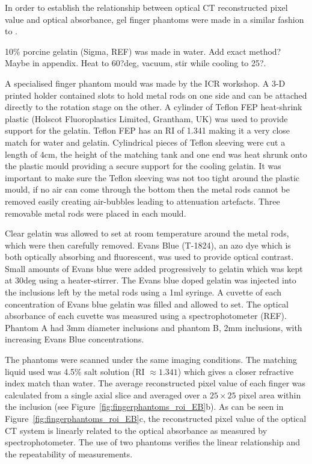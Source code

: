 In order to establish the relationship between optical CT reconstructed pixel value and optical absorbance,  gel finger phantoms were made in a similar fashion to \cite{Oldham:2003}.  

10\% porcine gelatin (Sigma, REF) was made in water. Add exact method? Maybe in appendix. Heat to 60?deg, vacuum, stir while cooling to 25?. 

A specialised finger phantom mould was made by the ICR workshop. A 3-D printed holder contained slots to hold metal rods on one side and can be attached directly to the rotation stage on the other. A cylinder of Teflon FEP heat-shrink plastic (Holscot Fluoroplastics Limited, Grantham, UK) was used to provide support for the gelatin. Teflon FEP has an RI of 1.341  making it a very close match for water and gelatin. \cite{Krstajic:2006kna} Cylindrical pieces of Teflon sleeving were cut a length of 4cm, the height of the matching tank and one end was heat shrunk onto the plastic mould providing a secure support for the cooling gelatin. It was important to make sure the Teflon sleeving was not too tight around the plastic mould, if no air can come through the bottom then the metal rods cannot be removed easily creating air-bubbles leading to attenuation artefacts. Three removable metal rods were placed in each mould.


Clear gelatin was allowed to set at room temperature around the metal rods, which  were then carefully removed.  Evans Blue (T-1824), an azo dye which is both optically absorbing and  fluorescent, was used to provide optical contrast. Small amounts of Evans blue were added progressively to gelatin which was kept at 30deg using a heater-stirrer. The Evans blue doped gelatin was injected into the inclusions left by the metal rods using a 1ml syringe. A cuvette of each concentration of Evans blue gelatin  was filled and allowed to set. The optical absorbance of each cuvette was measured using a spectrophotometer (REF). Phantom A had 3mm diameter inclusions and phantom B, 2mm inclusions, with increasing Evans Blue concentrations.

The phantoms were scanned under the same imaging conditions. The matching liquid used was 4.5\% salt solution (RI $\approx 1.341$) which  gives a closer refractive index match than water. The average reconstructed pixel value of each finger was calculated from a single axial slice and averaged over a $25 \times 25$ pixel area within the inclusion (see Figure~\ref{fig:fingerphantoms_roi_EB}b).
As can be seen in Figure~\ref{fig:fingerphantoms_roi_EB}c, the reconstructed pixel value of the optical CT system is linearly related to the optical absorbance as measured by  spectrophotometer.   The use of two phantoms verifies the linear relationship and the repeatability of measurements.  

